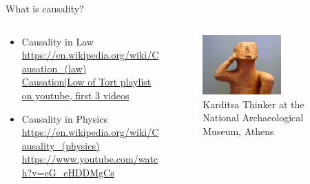 \documentclass{beamer}
\begin{document}
\begin{frame}{What is causality?}
  \begin{columns}
    \begin{column}{0.7\textwidth}
  \begin{itemize}
    \item Causality in Law  \url{https://en.wikipedia.org/wiki/Causation_(law)} \\
      \href{https://www.youtube.com/watch?v=XiCOmhdkM80&list=PLqMxKp2ot-3vDaLyaAZNgt8ijj6n0l460}{Causation|Low of Tort playlist on youtube, first 3 videos}  
    \item Causality in Physics \\
       \url{https://en.wikipedia.org/wiki/Causality_(physics)}  \\
       \url{https://www.youtube.com/watch?v=eG_eHDDMgCs} \\
       \cite{rovelli2022causationrootedthermodynamics}  
  \end{itemize}
  \end{column}
    \begin{column}{0.3\textwidth}
       \begin{figure}
	 \includegraphics[width=3cm]{thinker1}
	 \caption{Karditsa Thinker at the National Archaeological Museum, Athens} 
       \end{figure}
       \vfill
    \end{column}
  \end{columns}
\end{frame}
\end{document}
